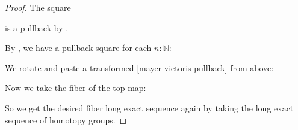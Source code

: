 \begin{proof}
  The square
  \begin{center}
  \end{center}
  is a pullback by \cite[Proposition 2.1.6]{egbert-thesis}.
  
  By \cite[Lemma 3.3.6]{wellen-thesis}, we have a pullback square for each $n:\mathbb{N}$:
  \begin{center}
  \end{center}
  We rotate and paste a transformed \cref{mayer-vietoris-pullback} from above:
  \begin{center}
  \end{center}
  Now we take the fiber of the top map:
  \begin{center}
  \end{center}
  So we get the desired fiber long exact sequence again by taking the long exact sequence of homotopy groups.
\end{proof}

